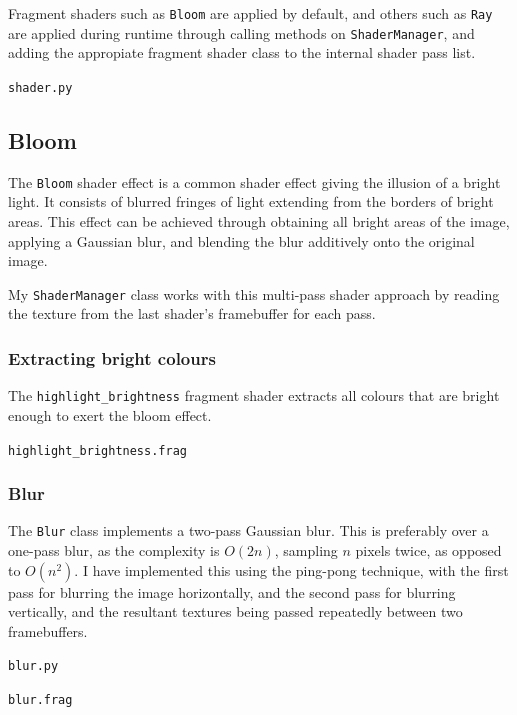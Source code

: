 \documentclass[../main/main.tex]{subfiles}
\begin{document}
Fragment shaders such as \lstinline{Bloom} are applied by default, and others such as \lstinline{Ray} are applied during runtime through calling methods on \lstinline{ShaderManager}, and adding the appropiate fragment shader class to the internal shader pass list.

\noindent\verb|shader.py|


\subsection{Bloom}
\label{sec:shader-bloom}
The \lstinline{Bloom} shader effect is a common shader effect giving the illusion of a bright light. It consists of blurred fringes of light extending from the borders of bright areas. This effect can be achieved through obtaining all bright areas of the image, applying a Gaussian blur, and blending the blur additively onto the original image.

My \lstinline{ShaderManager} class works with this multi-pass shader approach by reading the texture from the last shader's framebuffer for each pass.

\subsubsection*{Extracting bright colours}
The \lstinline{highlight_brightness} fragment shader extracts all colours that are bright enough to exert the bloom effect.

\noindent\verb|highlight_brightness.frag|


\subsubsection*{Blur}
The \lstinline{Blur} class implements a two-pass Gaussian blur. This is preferably over a one-pass blur, as the complexity is $O(2n)$, sampling $n$ pixels twice, as opposed to $O(n^2)$. I have implemented this using the ping-pong technique, with the first pass for blurring the image horizontally, and the second pass for blurring vertically, and the resultant textures being passed repeatedly between two framebuffers.

\noindent\verb|blur.py|


\bigskip
\noindent\verb|blur.frag|

\end{document}
